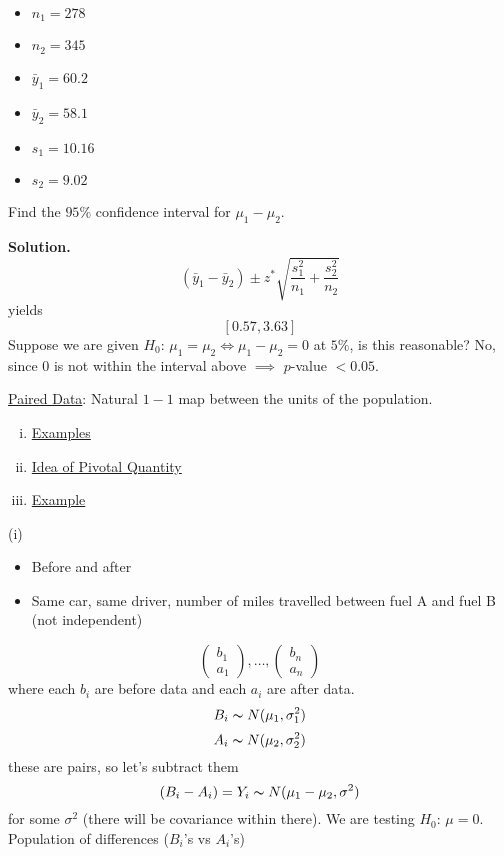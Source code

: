 \begin{exbox}
    \begin{example}\;
        \begin{itemize}
            \item $ n_1=278 $
            \item $ n_2=345 $
            \item $ \bar{y}_1=60.2 $
            \item $ \bar{y}_2=58.1 $
            \item $ s_1=10.16 $
            \item $ s_2=9.02 $
        \end{itemize}
        Find the $ 95\% $ confidence interval for $ \mu_1-\mu_2 $.

        \textbf{Solution.}
        \[ (\bar{y}_1-\bar{y}_2)\pm z^*\sqrt{\frac{s_1^2}{n_1}+\frac{s_2^2}{n_2}} \]
        yields
        \[ \left[ 0.57,3.63 \right] \]
        Suppose we are given $ H_0 $: $ \mu_1=\mu_2 \iff \mu_1-\mu_2=0 $ at $ 5\% $, is this reasonable? No,
        since $ 0 $ is not within the interval above $ \implies $ $ p $-value $ <0.05 $.
    \end{example}
\end{exbox}

\underline{Paired Data}: Natural $ 1-1 $ map between the units of the population.
\begin{enumerate}[(i)]
    \item \underline{Examples}
    \item \underline{Idea of Pivotal Quantity}
    \item \underline{Example}
\end{enumerate}
(i)
\begin{itemize}
    \item Before and after
    \item Same car, same driver, number of miles travelled between fuel A and fuel B (not independent)
\end{itemize}
\[ \begin{pmatrix}
        b_1 \\
        a_1
    \end{pmatrix},\ldots,
    \begin{pmatrix}
        b_n \\
        a_n
    \end{pmatrix} \]
where each $ b_i $ are before data and each $ a_i $ are after data.
\[ B_i \thicksim N(\mu_1,\sigma_1^2) \]
\[ A_i \thicksim N(\mu_2,\sigma_2^2) \]
these are pairs, so let's subtract them
\[ (B_i-A_i)=Y_i \thicksim N(\mu_1-\mu_2,\sigma^2) \]
for some $ \sigma^2 $ (there will be covariance within there).
We are testing $ H_0 $: $ \mu=0 $. Population of differences ($ B_i $'s vs $ A_i $'s)

